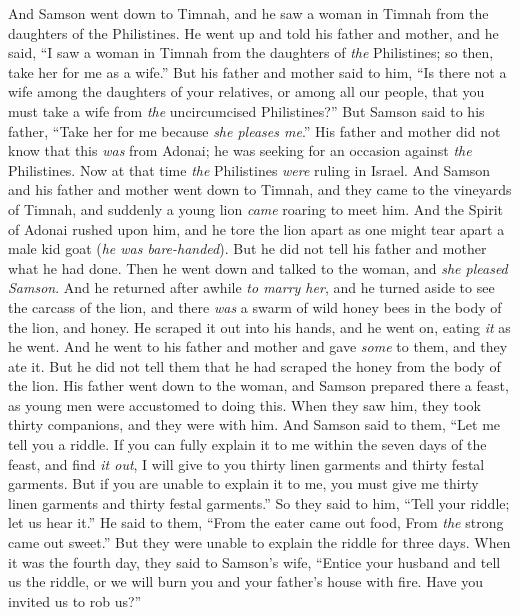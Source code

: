 \begin{biblechapter} %
 And Samson went down to Timnah, and he saw a woman in Timnah from the daughters of the Philistines.
\verse He went up and told his father and mother, and he said, “I saw a woman in Timnah from the daughters of \textit{the} Philistines; so then, take her for me as a wife.”
\verse But his father and mother said to him, “Is there not a wife among the daughters of your relatives, or among all our people, that you must take a wife from \textit{the} uncircumcised Philistines?” But Samson said to his father, “Take her for me because \textit{she pleases me}.”
\verse His father and mother did not know that this \textit{was} from Adonai; he was seeking for an occasion against \textit{the} Philistines. Now at that time \textit{the} Philistines \textit{were} ruling in Israel.
\verse And Samson and his father and mother went down to Timnah, and they came to the vineyards of Timnah, and suddenly a young lion \textit{came} roaring to meet him.
\verse And the Spirit of Adonai rushed upon him, and he tore the lion apart as one might tear apart a male kid goat (\textit{he was bare-handed}). But he did not tell his father and mother what he had done.
\verse Then he went down and talked to the woman, and \textit{she pleased Samson}.
\verse And he returned after awhile \textit{to marry her}, and he turned aside to see the carcass of the lion, and there \textit{was} a swarm of wild honey bees in the body of the lion, and honey.
\verse He scraped it out into his hands, and he went on, eating \textit{it} as he went. And he went to his father and mother and gave \textit{some} to them, and they ate it. But he did not tell them that he had scraped the honey from the body of the lion.
\verse His father went down to the woman, and Samson prepared there a feast, as young men were accustomed to doing this.
\verse When they saw him, they took thirty companions, and they were with him.
\verse And Samson said to them, “Let me tell you a riddle. If you can fully explain it to me within the seven days of the feast, and find \textit{it out}, I will give to you thirty linen garments and thirty festal garments.
\verse But if you are unable to explain it to me, you must give me thirty linen garments and thirty festal garments.” So they said to him, “Tell your riddle; let us hear it.”
\verse He said to them, “From the eater came out food, 
From \textit{the} strong came out sweet.” But they were unable to explain the riddle for three days.
\verse When it was the fourth day, they said to Samson’s wife, “Entice your husband and tell us the riddle, or we will burn you and your father’s house with fire. Have you invited us to rob us?”

\end{biblechapter}
